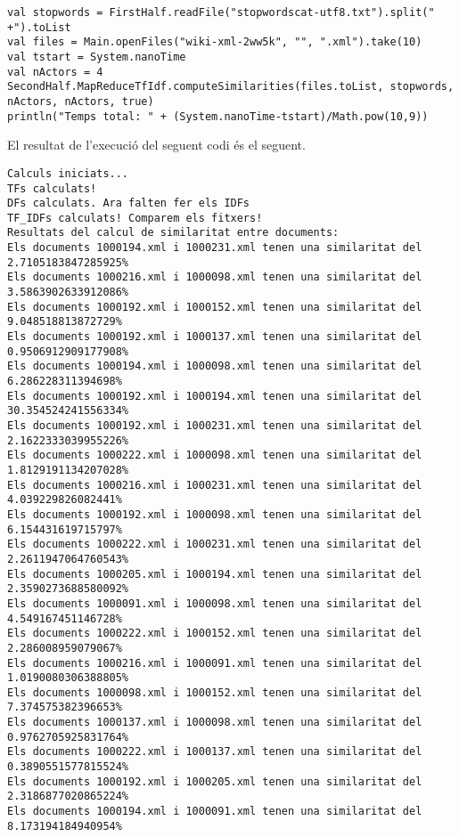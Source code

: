 \documentclass{report}
\begin{document}
\begin{lstlisting}[style=scalaHighlight]
val stopwords = FirstHalf.readFile("stopwordscat-utf8.txt").split(" +").toList
val files = Main.openFiles("wiki-xml-2ww5k", "", ".xml").take(10)
val tstart = System.nanoTime
val nActors = 4
SecondHalf.MapReduceTfIdf.computeSimilarities(files.toList, stopwords, nActors, nActors, true)
println("Temps total: " + (System.nanoTime-tstart)/Math.pow(10,9))
\end{lstlisting}

\newpage

El resultat de l'execució del seguent codi és el seguent.

\begin{verbatim}
Calculs iniciats...
TFs calculats!
DFs calculats. Ara falten fer els IDFs
TF_IDFs calculats! Comparem els fitxers!
Resultats del calcul de similaritat entre documents:
Els documents 1000194.xml i 1000231.xml tenen una similaritat del 2.7105183847285925%
Els documents 1000216.xml i 1000098.xml tenen una similaritat del 3.5863902633912086%
Els documents 1000192.xml i 1000152.xml tenen una similaritat del 9.048518813872729%
Els documents 1000192.xml i 1000137.xml tenen una similaritat del 0.9506912909177908%
Els documents 1000194.xml i 1000098.xml tenen una similaritat del 6.286228311394698%
Els documents 1000192.xml i 1000194.xml tenen una similaritat del 30.354524241556334%
Els documents 1000192.xml i 1000231.xml tenen una similaritat del 2.1622333039955226%
Els documents 1000222.xml i 1000098.xml tenen una similaritat del 1.8129191134207028%
Els documents 1000216.xml i 1000231.xml tenen una similaritat del 4.039229826082441%
Els documents 1000192.xml i 1000098.xml tenen una similaritat del 6.154431619715797%
Els documents 1000222.xml i 1000231.xml tenen una similaritat del 2.2611947064760543%
Els documents 1000205.xml i 1000194.xml tenen una similaritat del 2.3590273688580092%
Els documents 1000091.xml i 1000098.xml tenen una similaritat del 4.549167451146728%
Els documents 1000222.xml i 1000152.xml tenen una similaritat del 2.286008959079067%
Els documents 1000216.xml i 1000091.xml tenen una similaritat del 1.0190080306388805%
Els documents 1000098.xml i 1000152.xml tenen una similaritat del 7.374575382396653%
Els documents 1000137.xml i 1000098.xml tenen una similaritat del 0.9762705925831764%
Els documents 1000222.xml i 1000137.xml tenen una similaritat del 0.3890551577815524%
Els documents 1000192.xml i 1000205.xml tenen una similaritat del 2.3186877020865224%
Els documents 1000194.xml i 1000091.xml tenen una similaritat del 8.173194184940954%

\end{verbatim}
\end{document}
